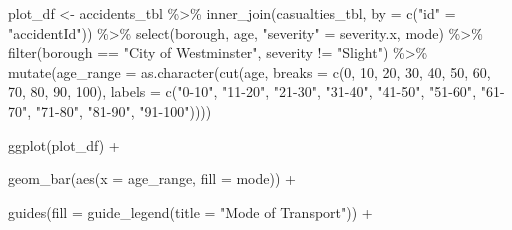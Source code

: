 \documentclass[
]{article}
\newenvironment{Shaded}{\begin{snugshade}}{\end{snugshade}}
\newcommand{\AttributeTok}[1]{\textcolor[rgb]{0.77,0.63,0.00}{#1}}
\newcommand{\DecValTok}[1]{\textcolor[rgb]{0.00,0.00,0.81}{#1}}
\newcommand{\FunctionTok}[1]{\textcolor[rgb]{0.00,0.00,0.00}{#1}}
\newcommand{\NormalTok}[1]{#1}
\newcommand{\OtherTok}[1]{\textcolor[rgb]{0.56,0.35,0.01}{#1}}
\newcommand{\SpecialCharTok}[1]{\textcolor[rgb]{0.00,0.00,0.00}{#1}}
\newcommand{\StringTok}[1]{\textcolor[rgb]{0.31,0.60,0.02}{#1}}
\begin{document}
\begin{Shaded}
\begin{Highlighting}[]
\NormalTok{plot\_df }\OtherTok{\textless{}{-}}\NormalTok{ accidents\_tbl }\SpecialCharTok{\%\textgreater{}\%} 
    \FunctionTok{inner\_join}\NormalTok{(casualties\_tbl, }\AttributeTok{by =} \FunctionTok{c}\NormalTok{(}\StringTok{"id"} \OtherTok{=} \StringTok{"accidentId"}\NormalTok{)) }\SpecialCharTok{\%\textgreater{}\%}
    \FunctionTok{select}\NormalTok{(borough, age, }\StringTok{"severity"} \OtherTok{=}\NormalTok{ severity.x, mode) }\SpecialCharTok{\%\textgreater{}\%}
    \FunctionTok{filter}\NormalTok{(borough }\SpecialCharTok{==} \StringTok{"City of Westminster"}\NormalTok{,}
\NormalTok{           severity }\SpecialCharTok{!=} \StringTok{"Slight"}\NormalTok{) }\SpecialCharTok{\%\textgreater{}\%}
    \FunctionTok{mutate}\NormalTok{(}\AttributeTok{age\_range =} \FunctionTok{as.character}\NormalTok{(}\FunctionTok{cut}\NormalTok{(age,}
                                        \AttributeTok{breaks =} \FunctionTok{c}\NormalTok{(}\DecValTok{0}\NormalTok{, }\DecValTok{10}\NormalTok{, }\DecValTok{20}\NormalTok{, }\DecValTok{30}\NormalTok{, }\DecValTok{40}\NormalTok{, }\DecValTok{50}\NormalTok{,}
                                                   \DecValTok{60}\NormalTok{, }\DecValTok{70}\NormalTok{, }\DecValTok{80}\NormalTok{, }\DecValTok{90}\NormalTok{, }\DecValTok{100}\NormalTok{),}
                                        \AttributeTok{labels =} \FunctionTok{c}\NormalTok{(}\StringTok{"0{-}10"}\NormalTok{, }\StringTok{"11{-}20"}\NormalTok{,}
                                                   \StringTok{"21{-}30"}\NormalTok{, }\StringTok{"31{-}40"}\NormalTok{,}
                                                   \StringTok{"41{-}50"}\NormalTok{, }\StringTok{"51{-}60"}\NormalTok{,}
                                                   \StringTok{"61{-}70"}\NormalTok{, }\StringTok{"71{-}80"}\NormalTok{,}
                                                   \StringTok{"81{-}90"}\NormalTok{, }\StringTok{"91{-}100"}\NormalTok{))))}
  
  \FunctionTok{ggplot}\NormalTok{(plot\_df) }\SpecialCharTok{+}
    
    \FunctionTok{geom\_bar}\NormalTok{(}\FunctionTok{aes}\NormalTok{(}\AttributeTok{x =}\NormalTok{ age\_range, }
                 \AttributeTok{fill =}\NormalTok{ mode)) }\SpecialCharTok{+}
    
    \FunctionTok{guides}\NormalTok{(}\AttributeTok{fill =} \FunctionTok{guide\_legend}\NormalTok{(}\AttributeTok{title =} \StringTok{"Mode of Transport"}\NormalTok{)) }\SpecialCharTok{+}
    

\end{Highlighting}
\end{Shaded}
\end{document}
